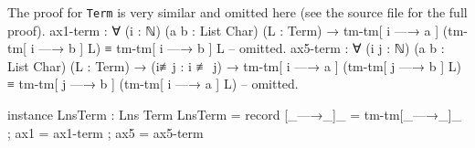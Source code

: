 \documentclass[logo,bsc,singlespacing,parskip,online]{infthesis}
\renewenvironment{code}{\mintedcopy[breaklines,breaksymbolleft=\;]{agda}}{\endmintedcopy}
\begin{document}
The proof for \texttt{Term} is very similar and omitted here (see the source file for the full proof).
\begin{code}
  ax1-term : ∀ (i : ℕ) (a b : List Char) (L : Term)
    → tm-tm[ i —→ a ] (tm-tm[ i —→ b ] L) ≡ tm-tm[ i —→ b ] L
  -- omitted.
  ax5-term : ∀ (i j : ℕ) (a b : List Char) (L : Term)
    → (i≢j : i ≢ j)
    → tm-tm[ i —→ a ] (tm-tm[ j —→ b ] L)
        ≡ tm-tm[ j —→ b ] (tm-tm[ i —→ a ] L)
  -- omitted.

  instance
    LnsTerm : Lns Term
    LnsTerm = record
      { [_—→_]_ = tm-tm[_—→_]_
      ; ax1 = ax1-term
      ; ax5 = ax5-term }
\end{code}

\begin{comment}
\begin{code}
  ax1-term i a b (fr x) = refl
  ax1-term i a b (# k) with i ≟ℕ k
  ... | yes refl = refl
  ... | no  i≢k  with i ≟ℕ k
  ... |   yes refl = contradiction refl i≢k
  ... |   no  _    = refl
  ax1-term i a b (ƛ A , L) rewrite ax1-term (suc i) a b L = refl
  ax1-term i a b (L · M)
    rewrite ax1-term i a b L | ax1-term i a b M = refl
  ax1-term i a b (Λ L) rewrite ax1-term i a b L = refl
  ax1-term i a b (L [ A ]) rewrite ax1-term i a b L = refl
  ax1-term i a b ‵zero = refl
  ax1-term i a b (‵suc L) rewrite ax1-term i a b L = refl

  ax5-term i j a b (fr x) i≢j = refl
  ax5-term i j a b (# k) i≢j with j ≟ℕ k
  ... | yes refl with i ≟ℕ j
  ... |   yes refl = contradiction refl i≢j
  ... |   no  i≢j with j ≟ℕ j
  ... |     yes refl = refl
  ... |     no  j≢j  = contradiction refl j≢j
  ax5-term i j a b (# k) i≢j | no j≢k with i ≟ℕ k
  ... | yes refl = refl
  ... | no  i≢k with j ≟ℕ k
  ... |   yes refl = contradiction refl j≢k
  ... |   no  j≢k  = refl
  ax5-term i j a b (ƛ A , L) i≢j
    rewrite ax5-term (suc i) (suc j) a b L (suc-preserves-≢ i≢j)
      = refl
  ax5-term i j a b (L · M) i≢j
    rewrite ax5-term i j a b L i≢j | ax5-term i j a b M i≢j = refl
  ax5-term i j a b (Λ L) i≢j
    rewrite ax5-term i j a b L i≢j = refl
  ax5-term i j a b (L [ A ]) i≢j
    rewrite ax5-term i j a b L i≢j = refl
  ax5-term i j a b ‵zero i≢j = refl
  ax5-term i j a b (‵suc L) i≢j rewrite ax5-term i j a b L i≢j
    = refl
\end{code}
\end{comment}
\end{document}
